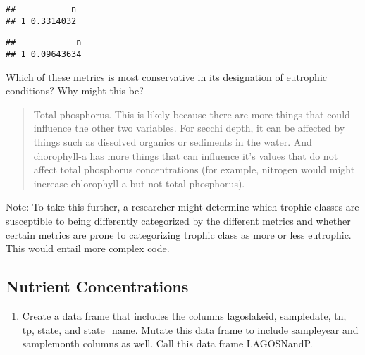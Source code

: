 \documentclass[]{article}
\newenvironment{Shaded}{\begin{snugshade}}{\end{snugshade}}
\newcommand{\CommentTok}[1]{\textcolor[rgb]{0.56,0.35,0.01}{\textit{#1}}}
\newcommand{\DecValTok}[1]{\textcolor[rgb]{0.00,0.00,0.81}{#1}}
\newcommand{\KeywordTok}[1]{\textcolor[rgb]{0.13,0.29,0.53}{\textbf{#1}}}
\newcommand{\NormalTok}[1]{#1}
\newcommand{\OperatorTok}[1]{\textcolor[rgb]{0.81,0.36,0.00}{\textbf{#1}}}
\providecommand{\tightlist}{%
  \setlength{\itemsep}{0pt}\setlength{\parskip}{0pt}}
\begin{document}
\begin{verbatim}
##           n
## 1 0.3314032
\end{verbatim}

\begin{Shaded}
\end{Shaded}

\begin{verbatim}
##            n
## 1 0.09643634
\end{verbatim}

Which of these metrics is most conservative in its designation of
eutrophic conditions? Why might this be?

\begin{quote}
Total phosphorus. This is likely because there are more things that
could influence the other two variables. For secchi depth, it can be
affected by things such as dissolved organics or sediments in the water.
And chorophyll-a has more things that can influence it's values that do
not affect total phosphorus concentrations (for example, nitrogen would
might increase chlorophyll-a but not total phosphorus).
\end{quote}

Note: To take this further, a researcher might determine which trophic
classes are susceptible to being differently categorized by the
different metrics and whether certain metrics are prone to categorizing
trophic class as more or less eutrophic. This would entail more complex
code.

\hypertarget{nutrient-concentrations}{%
\subsection{Nutrient Concentrations}\label{nutrient-concentrations}}

\begin{enumerate}
\def\labelenumi{\arabic{enumi}.}
\setcounter{enumi}{7}
\tightlist
\item
  Create a data frame that includes the columns lagoslakeid, sampledate,
  tn, tp, state, and state\_name. Mutate this data frame to include
  sampleyear and samplemonth columns as well. Call this data frame
  LAGOSNandP.
\end{enumerate}
\end{document}
